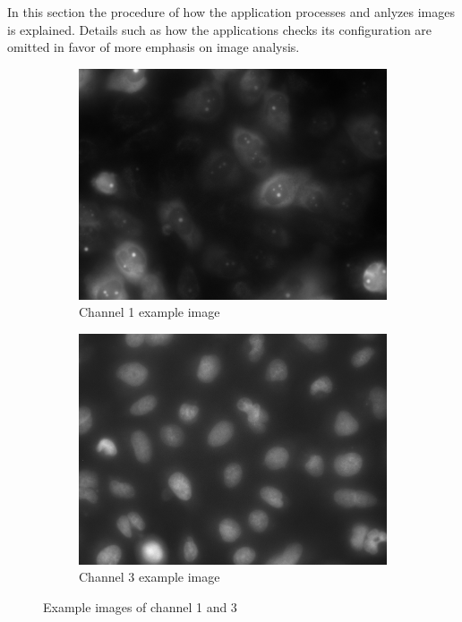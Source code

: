 \documentclass[a4paper, 11pt]{article}
\begin{document}
In this section the procedure of how the application processes and anlyzes
images is explained. Details such as how the applications checks its
configuration are omitted in favor of more emphasis on image analysis.

\begin{figure}[h]
\centering
\begin{subfigure}[b]{0.48\textwidth}
\includegraphics[width=\textwidth]{images/example_Kanal1}
\caption{Channel 1 example image}
\end{subfigure}
\begin{subfigure}[b]{0.48\textwidth}
\includegraphics[width=\textwidth]{images/example_Kanal3}
\caption{Channel 3 example image}
\end{subfigure}
\caption{Example images of channel 1 and 3}
\label{fig:example_images}
\end{figure}
\end{document}
